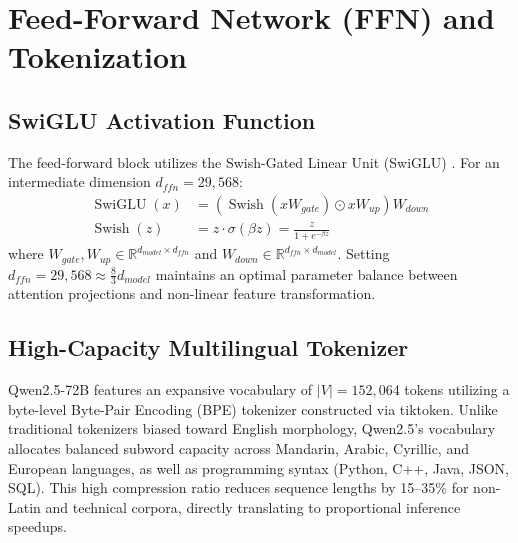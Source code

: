 \documentclass[conference]{IEEEtran}
\begin{document}
\section{Feed-Forward Network (FFN) and Tokenization}

\subsection{SwiGLU Activation Function}
The feed-forward block utilizes the Swish-Gated Linear Unit (SwiGLU) \cite{shazeer2020glu}. For an intermediate dimension $d_{ffn} = 29,568$:
\begin{align}
\operatorname{SwiGLU}(x) &= \left( \operatorname{Swish}(x W_{gate}) \odot x W_{up} \right) W_{down} \\
\operatorname{Swish}(z) &= z \cdot \sigma(\beta z) = \frac{z}{1 + e^{-\beta z}}
\end{align}
where $W_{gate}, W_{up} \in \mathbb{R}^{d_{model} \times d_{ffn}}$ and $W_{down} \in \mathbb{R}^{d_{ffn} \times d_{model}}$.
Setting $d_{ffn} = 29,568 \approx \frac{8}{3} d_{model}$ maintains an optimal parameter balance between attention projections and non-linear feature transformation.

\subsection{High-Capacity Multilingual Tokenizer}
Qwen2.5-72B features an expansive vocabulary of $|V| = 152,064$ tokens utilizing a byte-level Byte-Pair Encoding (BPE) tokenizer constructed via tiktoken. Unlike traditional tokenizers biased toward English morphology, Qwen2.5's vocabulary allocates balanced subword capacity across Mandarin, Arabic, Cyrillic, and European languages, as well as programming syntax (Python, C++, Java, JSON, SQL). This high compression ratio reduces sequence lengths by 15--35\% for non-Latin and technical corpora, directly translating to proportional inference speedups.
\end{document}
